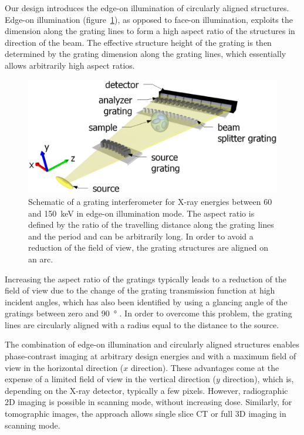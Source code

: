 \documentclass[aip,apl,amsmath,amssymb,floatfix,reprint,a4paper]{revtex4-1}
\begin{document}
Our design introduces the edge-on
illumination of circularly aligned structures. Edge-on illumination
(figure~\ref{Fig:schematic}), as
opposed to face-on illumination, exploits the dimension along the grating
lines to form a high aspect ratio of the structures in direction of the beam. The
effective structure height of the grating is then determined by the grating
dimension along the grating lines, which essentially allows arbitrarily high
aspect ratios. 
\begin{figure}[ht]
    \includegraphics[width=\linewidth]{figures/figure1.eps}
    \caption{Schematic of a grating
        interferometer for X-ray energies between 60 and
        \SI{150}{\kilo\electronvolt} in edge-on illumination mode. The
        aspect ratio is defined by the ratio of the travelling distance along the
        grating lines and the period and can be arbitrarily long. In order to avoid
        a reduction of the field of view, the grating structures are aligned on an
    arc.}
    \label{Fig:schematic}
\end{figure}

Increasing the aspect ratio of the gratings typically leads to a
reduction of the field of view due to the change of the grating transmission
function at high incident angles, which has also been identified by using a
glancing angle of the gratings between zero and \SI{90}{\degree}
\cite{Stutman2012a}. In order to overcome this problem, the grating lines are circularly aligned 
with a radius equal to the distance to the source.

The combination of edge-on illumination and circularly aligned structures
enables phase-contrast imaging at arbitrary design energies and with a
maximum field of view in the horizontal direction ($x$ direction). These
advantages come at the expense of a limited field of view in the vertical
direction ($y$ direction), which is, depending on the X-ray detector,
typically a few pixels. However, radiographic 2D imaging is possible in
scanning mode, without increasing dose. Similarly, for tomographic images,
the approach allows single slice \ac{CT} or full 3D imaging in scanning mode.
\end{document}

